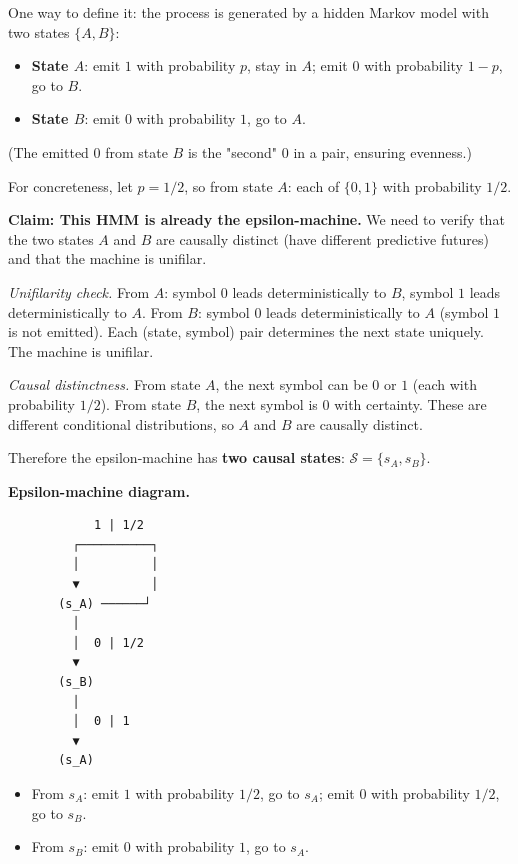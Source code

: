 One way to define it: the process is generated by a hidden Markov model with two states $\{ A, B\} $:

\begin{itemize}
  \item \textbf{State $A$}: emit $1$ with probability $p$, stay in $A$; emit $0$ with probability $1-p$, go to $B$.
  \item \textbf{State $B$}: emit $0$ with probability $1$, go to $A$.
\end{itemize}

(The emitted $0$ from state $B$ is the "second" $0$ in a pair, ensuring evenness.)

For concreteness, let $p = 1/2$, so from state $A$: each of $\{ 0, 1\} $ with probability $1/2$.

\textbf{Claim: This HMM is already the epsilon-machine.} We need to verify that the two states $A$ and $B$ are causally distinct (have different predictive futures) and that the machine is unifilar.

\textit{Unifilarity check.} From $A$: symbol $0$ leads deterministically to $B$, symbol $1$ leads deterministically to $A$. From $B$: symbol $0$ leads deterministically to $A$ (symbol $1$ is not emitted). Each (state, symbol) pair determines the next state uniquely. The machine is unifilar.

\textit{Causal distinctness.} From state $A$, the next symbol can be $0$ or $1$ (each with probability $1/2$). From state $B$, the next symbol is $0$ with certainty. These are different conditional distributions, so $A$ and $B$ are causally distinct.

Therefore the epsilon-machine has \textbf{two causal states}: $\mathcal{S} = \{ s_A, s_B\} $.

\textbf{Epsilon-machine diagram.}

\begin{lstlisting}
            1 | 1/2
         ┌──────────┐
         │          │
         ▼          │
       (s_A) ──────┘
         │
         │  0 | 1/2
         ▼
       (s_B)
         │
         │  0 | 1
         ▼
       (s_A)
\end{lstlisting}

\begin{itemize}
  \item From $s_A$: emit $1$ with probability $1/2$, go to $s_A$; emit $0$ with probability $1/2$, go to $s_B$.
  \item From $s_B$: emit $0$ with probability $1$, go to $s_A$.
\end{itemize}

